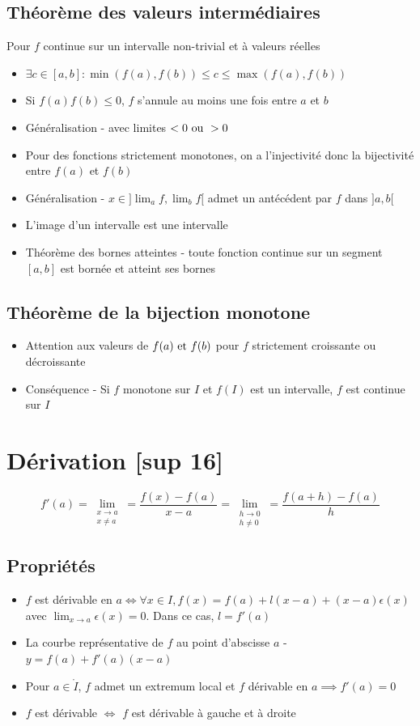 \documentclass[openany]{book}
\begin{document}
\subsection{Théorème des valeurs intermédiaires}
Pour $f$ continue sur un intervalle non-trivial et à valeurs réelles 
\begin{itemize}
    \item $\exists c \in [a, b]: \min(f(a), f(b)) \leq c \leq \max(f(a), f(b)) $
    \item Si $f(a)f(b) \leq 0$, $f$ s'annule au moins une fois entre $a$ et $b$
    \item Généralisation - avec limites $< 0 \text{ ou } > 0$
    \item Pour des fonctions strictement monotones, on a l'injectivité donc la bijectivité entre $f(a)$ et $f(b)$
    \item Généralisation - $ x \in ] \lim_a f, \lim_b f [ $ admet un antécédent par $f$ dans $] a, b [$
    \item L'image d'un intervalle est une intervalle
    \item Théorème des bornes atteintes - toute fonction continue sur un segment $[a, b]$ est bornée et atteint ses bornes
\end{itemize}

\subsection{Théorème de la bijection monotone}

\begin{itemize}
    \item Attention aux valeurs de $f(a) \text{ et } f(b)$ pour $f$ strictement croissante ou décroissante
    \item Conséquence - Si $f$ monotone sur $I$ et $f(I)$ est un intervalle, $f$ est continue sur $I$
\end{itemize}

\clearpage
\section{Dérivation [sup 16]}
\[ f'(a) = \lim_{\substack{x \rightarrow a \\ x \neq a}} = \frac{f(x) - f(a)}{x-a} = \lim_{\substack{h \rightarrow 0 \\ h \neq 0}} = \frac{f(a+h) - f(a)}{h} \]
\subsection{Propriétés}
\begin{itemize}
    \item $f$ est dérivable en $a \iff \forall x \in I, f(x) = f(a) + l(x-a) + (x-a)\epsilon(x) $ avec $\lim_{x\rightarrow a} \epsilon(x) = 0$. Dans ce cas, $l = f'(a)$
    \item La courbe représentative de $f$ au point d'abscisse $a$ - $y = f(a) + f'(a)(x-a)$
    \item Pour $a \in \mathring{I}$, $f$ admet un extremum local et $f$ dérivable en $a \implies f'(a) = 0$ 
    \item $f$ est dérivable $\iff$ $f$ est dérivable à gauche et à droite 
\end{itemize}
\end{document}
